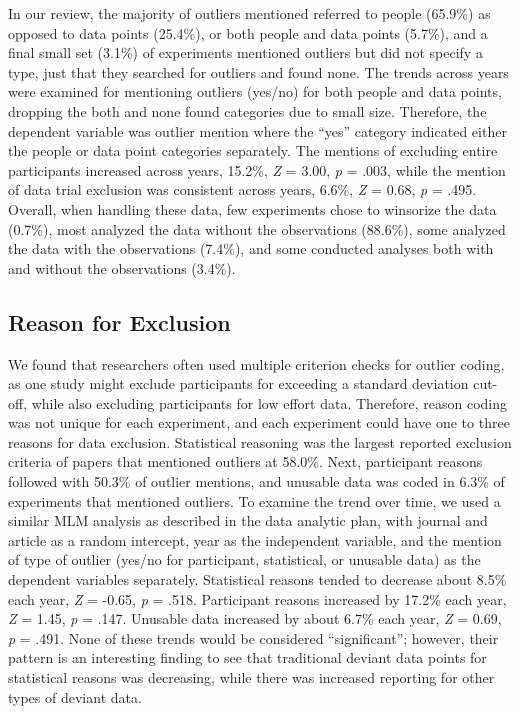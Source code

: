 \documentclass[english,,man]{apa6}
\theoremstyle{definition}
\theoremstyle{definition}
\theoremstyle{definition}
\theoremstyle{remark}
\begin{document}
In our review, the majority of outliers mentioned referred to people
(65.9\%) as opposed to data points (25.4\%), or both people and data
points (5.7\%), and a final small set (3.1\%) of experiments mentioned
outliers but did not specify a type, just that they searched for
outliers and found none. The trends across years were examined for
mentioning outliers (yes/no) for both people and data points, dropping
the both and none found categories due to small size. Therefore, the
dependent variable was outlier mention where the \enquote{yes} category
indicated either the people or data point categories separately. The
mentions of excluding entire participants increased across years,
15.2\%, \emph{Z} = 3.00, \emph{p} = .003, while the mention of data
trial exclusion was consistent across years, 6.6\%, \emph{Z} = 0.68,
\emph{p} = .495. Overall, when handling these data, few experiments
chose to winsorize the data (0.7\%), most analyzed the data without the
observations (88.6\%), some analyzed the data with the observations
(7.4\%), and some conducted analyses both with and without the
observations (3.4\%).

\subsection{Reason for Exclusion}\label{reason-for-exclusion}

We found that researchers often used multiple criterion checks for
outlier coding, as one study might exclude participants for exceeding a
standard deviation cut-off, while also excluding participants for low
effort data. Therefore, reason coding was not unique for each
experiment, and each experiment could have one to three reasons for data
exclusion. Statistical reasoning was the largest reported exclusion
criteria of papers that mentioned outliers at 58.0\%. Next, participant
reasons followed with 50.3\% of outlier mentions, and unusable data was
coded in 6.3\% of experiments that mentioned outliers. To examine the
trend over time, we used a similar MLM analysis as described in the data
analytic plan, with journal and article as a random intercept, year as
the independent variable, and the mention of type of outlier (yes/no for
participant, statistical, or unusable data) as the dependent variables
separately. Statistical reasons tended to decrease about 8.5\% each
year, \emph{Z} = -0.65, \emph{p} = .518. Participant reasons increased
by 17.2\% each year, \emph{Z} = 1.45, \emph{p} = .147. Unusable data
increased by about 6.7\% each year, \emph{Z} = 0.69, \emph{p} = .491.
None of these trends would be considered \enquote{significant}; however,
their pattern is an interesting finding to see that traditional deviant
data points for statistical reasons was decreasing, while there was
increased reporting for other types of deviant data.
\end{document}
